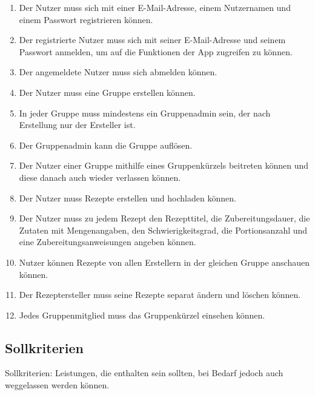 \documentclass[parskip=full]{scrartcl}
\begin{document}
\begin{enumerate}[start=1,label={$\langle$\bfseries RM\arabic*$\rangle$}, leftmargin = 5em, itemsep=4pt, parsep=4pt]
    \item Der Nutzer muss sich mit einer E-Mail-Adresse, einem Nutzernamen und einem Passwort registrieren können.\label{rm:Registering}
    \item Der registrierte Nutzer muss sich mit seiner E-Mail-Adresse und seinem Passwort anmelden, um auf die Funktionen der App zugreifen zu können. \label{rm:Login}
    \item Der angemeldete Nutzer muss sich abmelden können. \label{rm:Logout}
    \item Der Nutzer muss eine Gruppe erstellen können. \label{rm:GroupCreation}
    \item In jeder Gruppe muss mindestens ein Gruppenadmin sein, der nach Erstellung nur der Ersteller ist.\label{rm:GroupAdmin}
    \item Der Gruppenadmin kann die Gruppe auflösen. \label{rm:GroupDeletion}
    \item Der Nutzer einer Gruppe mithilfe eines Gruppenkürzels beitreten können und diese danach auch wieder verlassen können.\label{rm:GroupJoining}
    \item Der Nutzer muss Rezepte erstellen und hochladen können.\label{rm:RecipeCreation}
    \item Der Nutzer muss zu jedem Rezept den Rezepttitel, die Zubereitungsdauer, die Zutaten mit Mengenangaben, den Schwierigkeitsgrad, die Portionsanzahl und eine Zubereitungsanweisungen angeben können.\label{rm:RecipeContents}
    \item Nutzer können Rezepte von allen Erstellern in der gleichen Gruppe anschauen können.\label{rm:RecipeViewing}
    \item Der Rezeptersteller muss seine Rezepte separat ändern und löschen können.\label{rm:RecipeManagement}
    \item Jedes Gruppenmitglied muss das Gruppenkürzel einsehen können.\label{rm:GroupId}
\end{enumerate}

\subsection{Sollkriterien}
Sollkriterien: Leistungen, die enthalten sein sollten, bei Bedarf jedoch auch weggelassen werden können.
\end{document}
